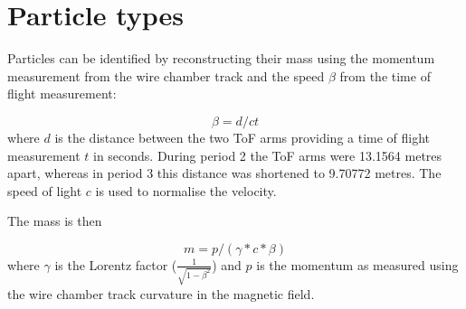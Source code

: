  \section{Particle types}
 
 Particles can be identified by reconstructing their mass using the momentum measurement from the wire chamber track and the speed $\beta$ from the time of flight measurement:
 
 \begin{equation}\label{eq_beta}
 \beta = d / c t
 \end{equation}
 where $d$ is the distance between the two ToF arms providing a time of flight measurement $t$ in seconds. During period 2 the ToF arms were 13.1564 metres apart, whereas in period 3 this distance was shortened to 9.70772 metres. The speed of light $c$ is used to normalise the velocity.
 
 The mass is then
 
   \begin{equation}\label{eq_mass}                                                                                                                                                               
  m = p /(\gamma*c*\beta)
 \end{equation}
 where $\gamma$ is the Lorentz factor ($\frac{1}{\sqrt{1-\beta^2} }$) and $p$ is the momentum as measured using the wire chamber track curvature in the magnetic field.
 
